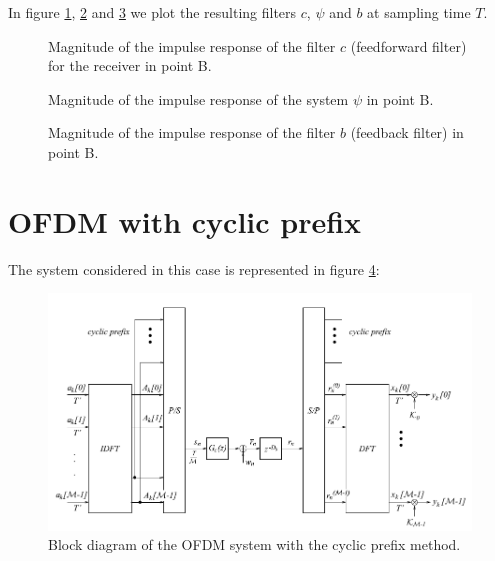 \documentclass[a4paper,11.5pt]{article}
\begin{document}
In figure \ref{fig:B_c}, \ref{fig:B_psi} and \ref{fig:B_b} we plot the resulting filters $c$, $\psi$ and $b$ at sampling time $T$. 

\begin{figure}[H]
	\begin{center}   
		\caption{Magnitude of the impulse response of the filter $c$ (feedforward filter) for the receiver in point B.}
		\label{fig:B_c}
	\end{center}
\end{figure}

\begin{figure}[H]
	\begin{center}   
		\caption{Magnitude of the impulse response of the system $\psi$ in point B.}
		\label{fig:B_psi}
	\end{center}
\end{figure}

\begin{figure}[H]
	\begin{center}   
		\caption{Magnitude of the impulse response of the filter $b$ (feedback filter) in point B.}
		\label{fig:B_b}
	\end{center}
\end{figure}



\section*{OFDM with cyclic prefix}

The system considered in this case is represented in figure \ref{fig:ofdm_schema}:

\begin{figure}[H]
	\begin{center}   
		\includegraphics[width=\textwidth]{figs/OFDM_schema.png} 
		\caption{Block diagram of the OFDM system with the cyclic prefix method.}
		\label{fig:ofdm_schema}
	\end{center}
\end{figure}
\end{document}
